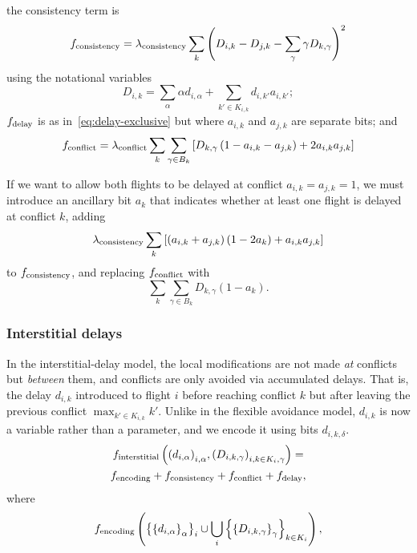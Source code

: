 the consistency term is
\begin{equation}
f_{\mathrm{consistency}}
=
\lambda_{\mathrm{consistency}}
\sum_k
{\left( 
D_{i, k} - D_{j, k}
-
\sum_{\gamma} \gamma D_{k, \gamma}
\right)}^2
\end{equation}
using the notational variables
\begin{equation}
D_{i, k} = \sum_{\alpha} \alpha d_{i, \alpha} +
\sum_{k' \in K_{i, k}}
d_{i, k'} a_{i, k'};
\end{equation}
$f_{\mathrm{delay}}$ is as in~\eqref{eq:delay-exclusive} but where $a_{i,k}$ and $a_{j, k}$ are separate bits;
and
\begin{equation}
f_{\mathrm{conflict}}
=
\lambda_{\mathrm{conflict}}
\sum_k \sum_{\gamma \in B_k} 
\left[
D_{k, \gamma}
\left(1 - a_{i, k} - a_{j, k}\right)
+ 2 a_{i, k} a_{j, k}
\right]
\end{equation}

If we want to allow both flights to be delayed at conflict $a_{i,k} = a_{j, k} = 1$, we must introduce an ancillary bit $a_k$ that indicates whether at least one flight is delayed at conflict $k$, adding
\begin{equation}
  \lambda_{\mathrm{consistency}}
  \sum_{k} 
  \left[
    \left(a_{i, k} + a_{j, k} \right) \left(1 - 2 a_k\right)
    + a_{i, k} a_{j, k}
  \right]
\end{equation}
to $f_{\mathrm{consistency}}$, and
replacing $f_{\mathrm{conflict}}$ with
\begin{equation}
\sum_k \sum_{\gamma \in B_k} D_{k, \gamma} (1 - a_k).
\end{equation}

\subsubsection{Interstitial delays}

In the interstitial-delay model, the local modifications are not made \emph{at} conflicts but \emph{between} them, and conflicts are only avoided via accumulated delays.
That is, the delay $d_{i, k}$ introduced to flight $i$ before reaching conflict $k$ but after leaving the previous conflict $\max_{k' \in K_{i, k}}k'$.
Unlike in the flexible avoidance model, $d_{i,k}$ is now a variable rather than a parameter, and we encode it using bits $d_{i, k, \delta}$.
\begin{multline}
f_{\mathrm{interstitial}}
\left(
{\left(
d_{i, \alpha}
\right)}_{i, \alpha},
{\left(
D_{i, k, \gamma}
\right)}_{i, k \in K_i, \gamma}
\right)
=\\
f_{\mathrm{encoding}}
+
f_{\mathrm{consistency}}
+
f_{\mathrm{conflict}}
+
f_{\mathrm{delay}},
\end{multline}
where
\begin{equation}
f_{\mathrm{encoding}}
\left(
{\left\{
{\left\{
d_{i, \alpha}
\right\}}_{\alpha}
\right\}}_i
\cup
\bigcup_i
{\left\{
{\left\{
D_{i, k, \gamma}
\right\}}_{\gamma}
\right\}}_{k \in K_i}
\right),
\end{equation}

